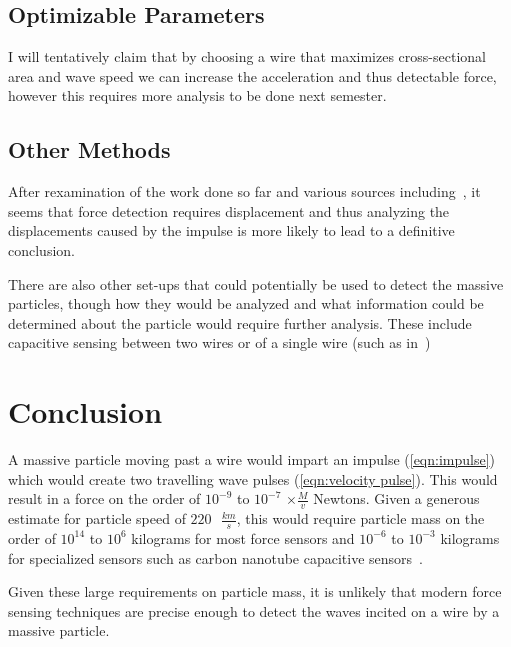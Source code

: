 \documentclass{report}
\begin{document}
\section*{Optimizable Parameters}
I will tentatively claim that by choosing a wire that maximizes cross-sectional area and wave speed we can increase the acceleration and thus detectable force, however this requires more analysis to be done next semester.

\section*{Other Methods}
After rexamination of the work done so far and various sources including~\cite{Gosh2023,WEI2015359}, it seems that force detection requires displacement and thus analyzing the displacements caused by the impulse is more likely to lead to a definitive conclusion.

There are also other set-ups that could potentially be used to detect the massive particles, though how they would be analyzed and what information could be determined about the particle would require further analysis. 
These include capacitive sensing between two wires or of a single wire (such as in~\cite{Moser2013})
\chapter*{Conclusion}
A massive particle moving past a wire would impart an impulse (\ref{eqn:impulse}) which would create two travelling wave pulses (\ref{eqn:velocity pulse}). 
This would result in a force on the order of $10^{-9}$ to $10^{-7}$ $\times \frac{M}{v}$ Newtons. 
Given a generous estimate for particle speed of $220 \text{ } \frac{km}{s}$, this would require particle mass on the order of $10^{14}$ to $10^{6}$ kilograms for most force sensors and $10^{-6}$ to $10^{-3}$ kilograms for specialized sensors such as carbon nanotube capacitive sensors~\cite{Moser2013}.

Given these large requirements on particle mass, it is unlikely that modern force sensing techniques are precise enough to detect the waves incited on a wire by a massive particle. 
\printbibliography[]
\end{document}
